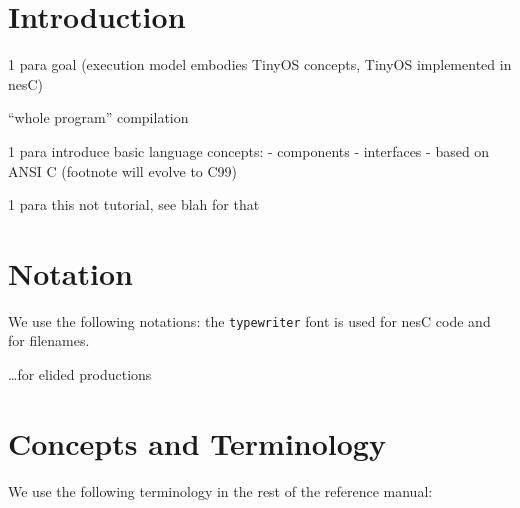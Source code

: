 \documentclass[11pt]{article}
\newcommand{\nesc}{nesC\xspace}
\begin{document}
\section{Introduction}

1 para goal (execution model embodies TinyOS concepts, TinyOS implemented
in \nesc)

``whole program'' compilation

1 para introduce basic language concepts:
- components
- interfaces
- based on ANSI C (footnote will evolve to C99)

1 para this not tutorial, see blah for that

\section{Notation}

We use the following notations: the \texttt{typewriter} font is used for
\nesc code and for filenames.

\ldots for elided productions

\section{Concepts and Terminology}

We use the following terminology in the rest of the reference manual:
\end{document}
